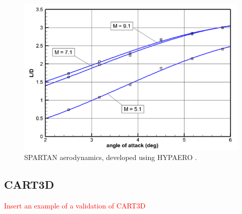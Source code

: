 \begin{figure}
\centering
\includegraphics[width=0.7\linewidth]{figures/2_literature-review/HYPAERO-aero}
\caption{SPARTAN aerodynamics, developed using HYPAERO \cite{Preller2017}.}
\label{fig:HYPAERO-aero}
\end{figure}


\subsection{CART3D}
\textcolor{red}{Insert an example of a validation of CART3D}


